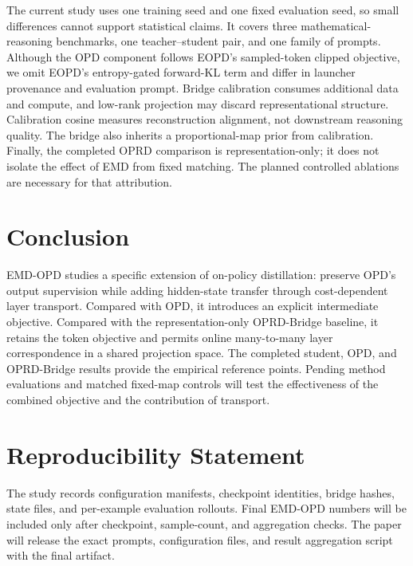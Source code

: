 \documentclass[10pt,twocolumn]{article}
\newcommand{\method}{\textsc{EMD-OPD}}
\begin{document}
The current study uses one training seed and one fixed evaluation seed, so small differences cannot support statistical claims. It covers three mathematical-reasoning benchmarks, one teacher--student pair, and one family of prompts. Although the OPD component follows EOPD's sampled-token clipped objective, we omit EOPD's entropy-gated forward-KL term and differ in launcher provenance and evaluation prompt. Bridge calibration consumes additional data and compute, and low-rank projection may discard representational structure. Calibration cosine measures reconstruction alignment, not downstream reasoning quality. The bridge also inherits a proportional-map prior from calibration. Finally, the completed OPRD comparison is representation-only; it does not isolate the effect of EMD from fixed matching. The planned controlled ablations are necessary for that attribution.

\section{Conclusion}

\method{} studies a specific extension of on-policy distillation: preserve OPD's output supervision while adding hidden-state transfer through cost-dependent layer transport. Compared with OPD, it introduces an explicit intermediate objective. Compared with the representation-only OPRD-Bridge baseline, it retains the token objective and permits online many-to-many layer correspondence in a shared projection space. The completed student, OPD, and OPRD-Bridge results provide the empirical reference points. Pending method evaluations and matched fixed-map controls will test the effectiveness of the combined objective and the contribution of transport.

\section*{Reproducibility Statement}

The study records configuration manifests, checkpoint identities, bridge hashes, state files, and per-example evaluation rollouts. Final \method{} numbers will be included only after checkpoint, sample-count, and aggregation checks. The paper will release the exact prompts, configuration files, and result aggregation script with the final artifact.
\end{document}
